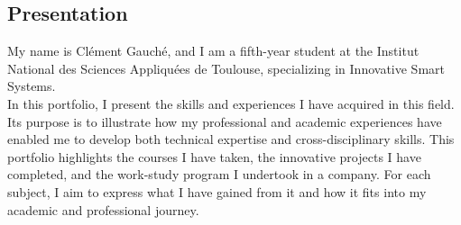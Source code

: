 

\subsection*{Presentation}
\indent \indent My name is Clément Gauché, and I am a fifth-year student at the Institut National des Sciences Appliquées de Toulouse, specializing in Innovative Smart Systems.\\
In this portfolio, I present the skills and experiences I have acquired in this field. Its purpose is to illustrate how my professional and academic experiences have enabled me to develop both technical expertise and cross-disciplinary skills.
This portfolio highlights the courses I have taken, the innovative projects I have completed, and the work-study program I undertook in a company. For each subject, I aim to express what I have gained from it and how it fits into my academic and professional journey.

